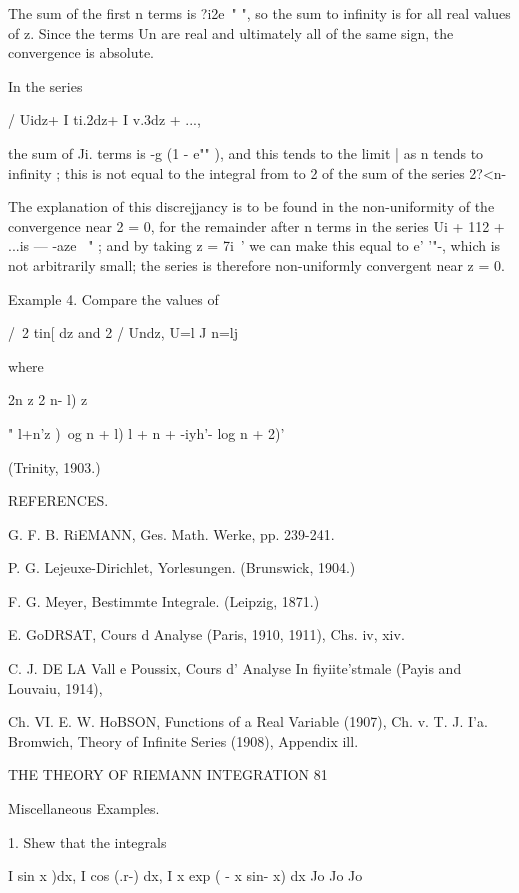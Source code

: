 The sum of the first n terms is ?i2e~" ", so the sum to infinity is for all real values 
of z. Since the terms Un are real and ultimately all of the same sign, the convergence 
is absolute. 



In the series 



/ Uidz+ I ti.2dz+ I v.3dz + ..., 



the sum of Ji. terms is -g (1 - e"" ), and this tends to the limit | as n tends to infinity ; this 
is not equal to the integral from to 2 of the sum of the series 2?<n- 

The explanation of this discrejjancy is to be found in the non-uniformity of the 
convergence near 2 = 0, for the remainder after n terms in the series Ui + 112 + ...is — -aze~ "  ; 
and by taking z = 7i~'  we can make this equal to e' '"-, which is not arbitrarily small; the 
series is therefore non-uniformly convergent near z = 0. 

Example 4. Compare the values of 

/\ 2 tin[ dz and 2 / Undz, 
U=l J n=lj 

where 

2n z 2 n- l) z 



"  l+n'z )\ og n + l)  l +  n + -iyh'- log n + 2)' 

(Trinity, 1903.) 

REFERENCES. 

G. F. B. RiEMANN, Ges. Math. Werke, pp. 239-241. 

P. G. Lejeuxe-Dirichlet, Yorlesungen. (Brunswick, 1904.) 

F. G. Meyer, Bestimmte Integrale. (Leipzig, 1871.) 

E. GoDRSAT, Cours d  Analyse (Paris, 1910, 1911), Chs. iv, xiv. 

C. J. DE LA Vall e Poussix, Cours d' Analyse In fiyiite'stmale (Payis and Louvaiu, 1914), 

Ch. VI. 
E. W. HoBSON, Functions of a Real Variable (1907), Ch. v. 
T. J. I'a. Bromwich, Theory of Infinite Series (1908), Appendix ill. 



THE THEORY OF RIEMANN INTEGRATION 81 

Miscellaneous Examples. 

1. Shew that the integrals 

I sin  x )dx, I cos (.r-) dx, I x exp ( - x  sin- x) dx 
Jo Jo Jo 


